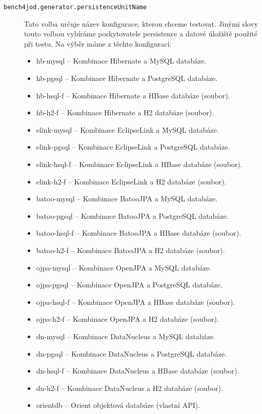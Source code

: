 \begin{description}
  \item[\texttt{bench4jod.generator.persistenceUnitName}] Tato volba určuje název konfigurace, kterou chceme testovat. Jinými slovy touto volbou vybíráme poskytovatele persistence a datové úložiště použité při testu. Na výběr máme z těchto konfigurací:
  \begin{itemize}
     \item hb-mysql -- Kombinace Hibernate a MySQL databáze.
     \item hb-pgsql -- Kombinace Hibernate a PostgreSQL databáze.
     \item hb-hsql-f -- Kombinace Hibernate a HBase databáze (soubor).
     \item hb-h2-f -- Kombinace Hibernate a H2 databáze (soubor).
     \item elink-mysql -- Kombinace EclipseLink a MySQL databáze.
     \item elink-pgsql -- Kombinace EclipseLink a PostgreSQL databáze.
     \item elink-hsql-f -- Kombinace EclipseLink a HBase databáze (soubor).
     \item elink-h2-f -- Kombinace EclipseLink a H2 databáze (soubor).
     \item batoo-mysql -- Kombinace BatooJPA a MySQL databáze.
     \item batoo-pgsql -- Kombinace BatooJPA a PostgreSQL databáze.
     \item batoo-hsql-f -- Kombinace BatooJPA a HBase databáze (soubor).
     \item batoo-h2-f -- Kombinace BatooJPA a H2 databáze (soubor).
     \item ojpa-mysql -- Kombinace OpenJPA a MySQL databáze.
     \item ojpa-pgsql -- Kombinace OpenJPA a PostgreSQL databáze.
     \item ojpa-hsql-f -- Kombinace OpenJPA a HBase databáze (soubor).
     \item ojpa-h2-f -- Kombinace OpenJPA a H2 databáze (soubor).
     \item dn-mysql -- Kombinace DataNucleus a MySQL databáze.
     \item dn-pgsql -- Kombinace DataNucleus a PostgreSQL databáze.
     \item dn-hsql-f -- Kombinace DataNucleus a HBase databáze (soubor).
     \item dn-h2-f -- Kombinace DataNucleus a H2 databáze (soubor).
     \item orientdb -- Orient objektová databáze (vlastní API).

\end{itemize}
\end{description}
